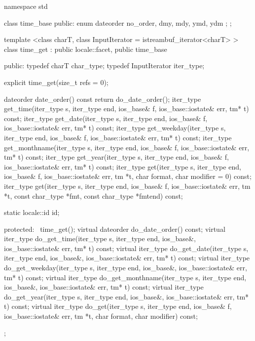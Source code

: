 %
\begin{codeblock}
namespace std {
  class time_base {
  public:
    enum dateorder { no_order, dmy, mdy, ymd, ydm };
  };

  template <class charT, class InputIterator = istreambuf_iterator<charT> >
  class time_get : public locale::facet, public time_base {
  public:
    typedef charT            char_type;
    typedef InputIterator    iter_type;

    explicit time_get(size_t refs = 0);

    dateorder date_order()  const { return do_date_order(); }
    iter_type get_time(iter_type s, iter_type end, ios_base& f,
                       ios_base::iostate& err, tm* t)  const;
    iter_type get_date(iter_type s, iter_type end, ios_base& f,
                       ios_base::iostate& err, tm* t)  const;
    iter_type get_weekday(iter_type s, iter_type end, ios_base& f,
                       ios_base::iostate& err, tm* t) const;
    iter_type get_monthname(iter_type s, iter_type end, ios_base& f,
                       ios_base::iostate& err, tm* t) const;
    iter_type get_year(iter_type s, iter_type end, ios_base& f,
                       ios_base::iostate& err, tm* t) const;
    iter_type get(iter_type s, iter_type end, ios_base& f,
                       ios_base::iostate& err, tm *t, char format, char modifier = 0) const;
    iter_type get(iter_type s, iter_type end, ios_base& f,
                       ios_base::iostate& err, tm *t, const char_type *fmt,
                       const char_type *fmtend) const;

    static locale::id id;

  protected:
    ~time_get();
    virtual dateorder do_date_order()  const;
    virtual iter_type do_get_time(iter_type s, iter_type end, ios_base&,
                                  ios_base::iostate& err, tm* t) const;
    virtual iter_type do_get_date(iter_type s, iter_type end, ios_base&,
                                  ios_base::iostate& err, tm* t) const;
    virtual iter_type do_get_weekday(iter_type s, iter_type end, ios_base&,
                                     ios_base::iostate& err, tm* t) const;
    virtual iter_type do_get_monthname(iter_type s, iter_type end, ios_base&,
                                       ios_base::iostate& err, tm* t) const;
    virtual iter_type do_get_year(iter_type s, iter_type end, ios_base&,
                                  ios_base::iostate& err, tm* t) const;
    virtual iter_type do_get(iter_type s, iter_type end, ios_base& f,
                             ios_base::iostate& err, tm *t, char format, char modifier) const;
  };
}
\end{codeblock}

